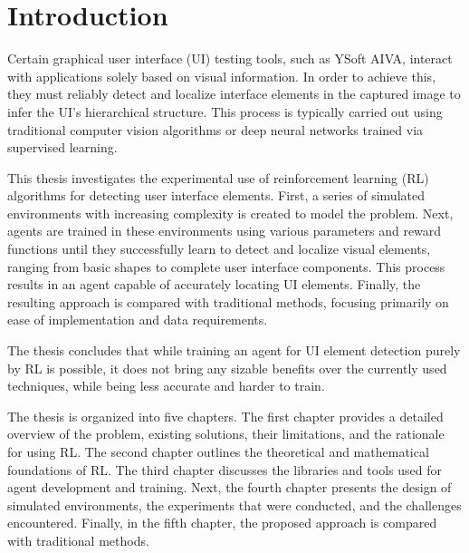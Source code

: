 \documentclass[
  digital,     %
  oneside,     %
  nosansbold,  %
  nocolorbold, %
  lof,         %
  lot,         %
]{fithesis4}
\begin{document}
\chapter*{Introduction}

Certain graphical user interface (UI) testing tools, such as YSoft AIVA, interact with applications solely based on visual information. In order to achieve this, they must reliably detect and localize interface elements in the captured image to infer the UI's hierarchical structure. This process is typically carried out using traditional computer vision algorithms or deep neural networks trained via supervised learning.

This thesis investigates the experimental use of reinforcement learning (RL) algorithms for detecting user interface elements. First, a series of simulated environments with increasing complexity is created to model the problem. Next, agents are trained in these environments using various parameters and reward functions until they successfully learn to detect and localize visual elements, ranging from basic shapes to complete user interface components. This process results in an agent capable of accurately locating UI elements. Finally, the resulting approach is compared with traditional methods, focusing primarily on ease of implementation and data requirements.

The thesis concludes that while training an agent for UI element detection purely by RL is possible, it does not bring any sizable benefits over the currently used techniques, while being less accurate and harder to train.

The thesis is organized into five chapters. The first chapter provides a detailed overview of the problem, existing solutions, their limitations, and the rationale for using RL. The second chapter outlines the theoretical and mathematical foundations of RL. The third chapter discusses the libraries and tools used for agent development and training. Next, the fourth chapter presents the design of simulated environments, the experiments that were conducted, and the challenges encountered. Finally, in the fifth chapter, the proposed approach is compared with traditional methods.
\end{document}
